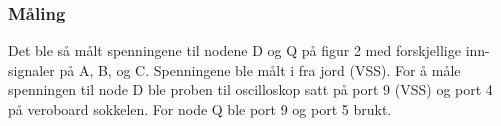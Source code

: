 \subsubsection{Måling}
Det ble så målt spenningene til nodene D og Q på figur 2 med forskjellige inn-signaler på A, B, og C. 
Spenningene ble målt i fra jord (VSS). For å måle spenningen til node D ble proben til oscilloskop satt på port 9 (VSS) og port 4 på veroboard sokkelen. 
For node Q ble port 9 og port 5 brukt.